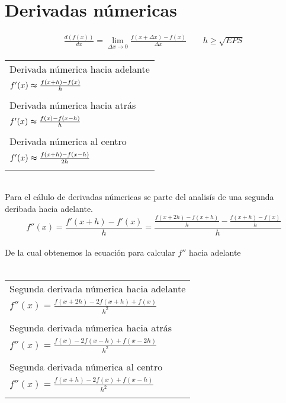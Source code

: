 \chapter{Derivadas n\'umericas}
\begin{center}
\begin{eqnarray}
\nonumber
\frac{d(f(x))}{dx}=\lim\limits_{\Delta x\to0}\frac{f(x+\Delta x)-f(x)}{\Delta x} \qquad\nonumber h\geq\sqrt{EPS}
\end{eqnarray}
\end{center}
\begin{tabular}{ l }
 Derivada n\'umerica hacia adelante \\
$f'(x)\thickapprox \frac{f(x+h)-f(x)}{h}$ \\
\\
 Derivada n\'umerica hacia atr\'as \\
$f'(x)\thickapprox \frac{f(x)-f(x-h)}{h}$ \\
\\
 Derivada n\'umerica al centro \\
$f'(x)\thickapprox \frac{f(x+h)-f(x-h)}{2h}$ \\
\\
\end{tabular}
\\
Para el c\'alulo de derivadas n\'umericas se parte del analis\'is de una segunda deribada hacia adelante.\\
\begin{displaymath}
f''(x)=\frac{f'(x+h)-f'(x)}{h}=\frac{\frac{f(x+2h)-f(x+h)}{h}-\frac{f(x+h)-f(x)}{h}}{h}
\end{displaymath} 
\\De la cual obtenemos la ecuaci\'on para calcular $f''$ hacia adelante\\ \\
\begin{tabular}{  l  }
Segunda derivada n\'umerica hacia adelante \\
$f''(x)=\frac{f(x+2h)-2f(x+h)+f(x)}{h^2}$ \\
\\
Segunda derivada n\'umerica hacia atr\'as \\
$f''(x)=\frac{f(x)-2f(x-h)+f(x-2h)}{h^2}$ \\
\\
Segunda derivada n\'umerica al centro \\
$f''(x)=\frac{f(x+h)-2f(x)+f(x-h)}{h^2}$ \\
\\
\end{tabular}
